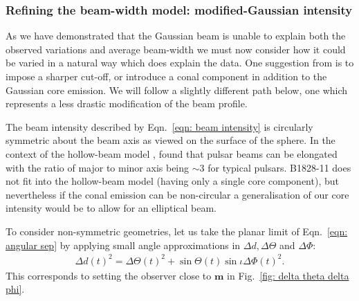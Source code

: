 \documentclass[../full_thesis/full_thesis.tex]{subfiles}
\begin{document}

\subsubsection{Refining the beam-width model: modified-Gaussian intensity}
\label{sec: refining the beam-width model}

As we have demonstrated that the Gaussian beam is unable to explain both the
observed variations and average beam-width we must now consider how it could be
varied in a natural way which does explain the data. One suggestion from
\citet{Akgun2006} is to impose a sharper cut-off, or introduce a conal
component in addition to the Gaussian core emission.  We will follow a slightly
different path below, one which represents a less drastic modification of the
beam profile.


The beam intensity described by Eqn.~\eqref{eqn: beam intensity} is circularly
symmetric about the beam axis as viewed on the surface of the sphere. In the
context of the hollow-beam model \citep{Radhakrishnan1969}, \citet{Narayan1983}
found that pulsar beams can be elongated with the ratio of major to minor axis
being $\sim3$ for typical pulsars. B1828-11 does not fit into the hollow-beam
model (having only a single core component), but nevertheless if the conal
emission can be non-circular a generalisation of our core intensity would be
to allow for an elliptical beam.

To consider non-symmetric geometries, let us take the planar limit of
Eqn.~\eqref{eqn: angular sep} by
applying small angle approximations in $\Delta d, \Delta\Theta$ and
$\Delta\Phi$:
\begin{align}
\Delta d(t)^{2} = \Delta \Theta(t)^{2} + \sin\Theta(t) \sin\iota \Delta\Phi(t)^{2}.
\label{eqn: angular sep expansion}
\end{align}
This corresponds to setting the observer close to $\mathbf{m}$ in
Fig.~\ref{fig: delta theta delta phi}.
\end{document}
